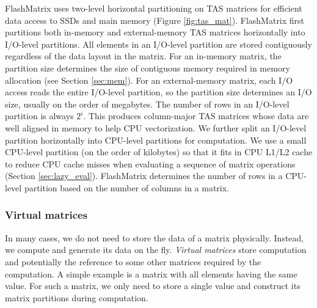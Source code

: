FlashMatrix uses two-level horizontal partitioning on TAS matrices for efficient
data access to SSDs and main memory (Figure \ref{fig:tas_mat}). FlashMatrix
first partitions both in-memory and external-memory TAS matrices horizontally
into I/O-level partitions. All elements in an I/O-level partition are stored
contiguously regardless of the data layout in the matrix. For an in-memory matrix,
the partition size determines the size of contiguous memory required in memory
allocation (see Section \ref{sec:mem}). For an external-memory matrix, each I/O
access reads the entire I/O-level partition, so the partition size determines an I/O
size, usually on the order of megabytes. The number of rows in an I/O-level
partition is always $2^i$. This produces column-major TAS matrices whose data
are well aligned in memory to help CPU vectorization.
We further split an I/O-level partition
horizontally into CPU-level partitions for computation. We use a small
CPU-level partition (on the order of kilobytes) so that it fits in CPU L1/L2
cache to reduce CPU cache misses when evaluating a sequence of matrix
operations (Section \ref{sec:lazy_eval}). FlashMatrix determines the number
of rows in a CPU-level partition based on the number of columns in a matrix.


\subsubsection{Virtual matrices} \label{virt_mat}
In many cases, we do not need to store the data of a matrix physically. Instead,
we compute and generate its data on the fly. \textit{Virtual matrices} store
computation and potentially the reference
to some other matrices required by the computation. A simple example is a matrix
with all elements having the same value. For such a matrix, we only need to store
a single value and construct its matrix partitions during computation.

